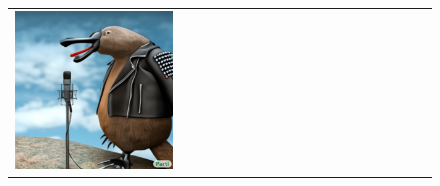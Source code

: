 \begin{figure}[ht!]
\begin{adjustwidth}{-0.8in}{-0.5in}
\begin{tabular}{cccccccccccccccccccc}
\multicolumn{2}{c}{\includegraphics[width=\threebythreecolwidth\textwidth]{figures/cherries/rock_platypus_2.jpg}} &&


\end{tabular}
\end{adjustwidth}
\end{figure}
